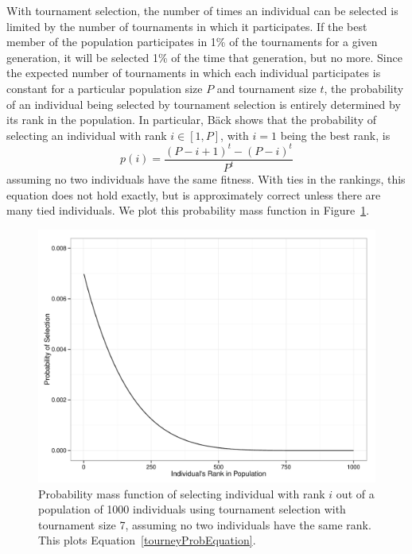 \documentclass{sig-alternate-05-2015}
\begin{document}
With tournament selection, the number of times an individual can be selected is limited by the number of tournaments in which it participates. If the best member of the population participates in 1\% of the tournaments for a given generation, it will be selected 1\% of the time that generation, but no more.
 Since the expected number of tournaments in which each individual participates is constant for a particular population size $P$ and tournament size $t$, the probability of an individual being selected by tournament selection is entirely determined by its rank in the population. In particular, B\"ack \cite{350042, Blickle:1995:MAT:645514.658088} shows that the probability of selecting an individual with rank $i \in [1,P]$, with $i = 1$ being the best rank, is
\begin{equation}\label{tourneyProbEquation}
p(i) = \frac{(P-i+1)^t - (P-i)^t}{P^t}
\end{equation}
assuming no two individuals have the same fitness. With ties in the rankings, this equation does not hold exactly, but is approximately correct unless there are many tied individuals. We plot this probability mass function in Figure~\ref{fig:prob-selection-tourney-7}.

\begin{figure}[t] %
\centering
\includegraphics[width=5in]{probSelectionTourney7.pdf}
\caption{Probability mass function of selecting individual with rank $i$ out of a population of 1000 individuals using tournament selection with tournament size 7, assuming no two individuals have the same rank. This plots Equation~\ref{tourneyProbEquation}.}
\label{fig:prob-selection-tourney-7}
\end{figure}
\end{document}
